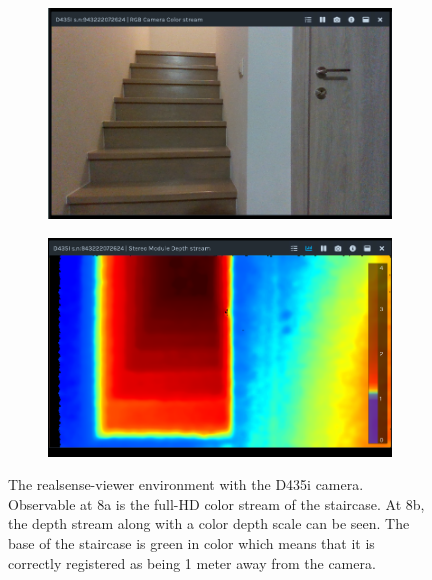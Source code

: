 \documentclass{article}
\begin{document}
\begin{figure}
\begin{subfigure}{0.5\textwidth}
  \centering
  \includegraphics[width=0.95\linewidth]{report1-img029.png}
  \caption{}
  \label{fig:sfig1}
\end{subfigure}%
\begin{subfigure}{0.5\textwidth}
  \centering
  \includegraphics[width=0.95\linewidth]{report1-img030.png}
  \caption{}
  \label{fig:sfig2}
\end{subfigure}
\caption{The realsense-viewer environment with the D435i camera. Observable at 8a is the full-HD color stream of the staircase. At 8b, the depth stream along with a color depth scale can be seen. The base of the staircase is green in color which means that it is correctly registered as being 1 meter away from the camera.}
\label{fig:fig}
\end{figure}
\end{document}
